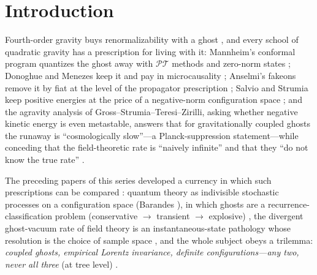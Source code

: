 \documentclass[11pt]{article}
\theoremstyle{definition}
\theoremstyle{remark}
\newcommand{\PT}{\mathcal{PT}}
\begin{document}
\newpage
\tableofcontents

\section{Introduction}
\label{sec:intro}

Fourth-order gravity buys renormalizability with a ghost
\cite{Salvio2018}, and every school of quadratic gravity has a
prescription for living with it: Mannheim's conformal program
quantizes the ghost away with $\PT$ methods and zero-norm states
\cite{BenderMannheim2008,BenderMannheim2008PRD,Mannheim2020}; Donoghue and
Menezes keep it and pay in microcausality \cite{DonoghueMenezes};
Anselmi's fakeons remove it by fiat at the level of the propagator
prescription \cite{Anselmi2018}; Salvio and Strumia keep positive
energies at the price of a negative-norm configuration space
\cite{SalvioStrumia2016}; and the agravity analysis of
Gross--Strumia--Teresi--Zirilli, asking whether negative kinetic
energy is even metastable, answers that for gravitationally coupled
ghosts the runaway is ``cosmologically slow''---a Planck-suppression
statement---while conceding that the field-theoretic rate is
``naively infinite'' and that they ``do not know the true rate''
\cite{GSTZ2021}.

The preceding papers of this series developed a currency in which
such prescriptions can be compared \cite{indivisible,instantaneous,conditioned}: quantum theory as indivisible stochastic processes on a
configuration space (Barandes \cite{Barandes2023,Barandes2025}), in
which ghosts are a recurrence-classification problem (conservative
$\to$ transient $\to$ explosive) \cite{indivisible}, the divergent
ghost-vacuum rate of field theory is an instantaneous-state
pathology whose resolution is the choice of sample space
\cite{instantaneous}, and the whole subject obeys a trilemma:
\emph{coupled ghosts, empirical Lorentz invariance, definite
configurations---any two, never all three} (at tree level) \cite{instantaneous}.
\end{document}
